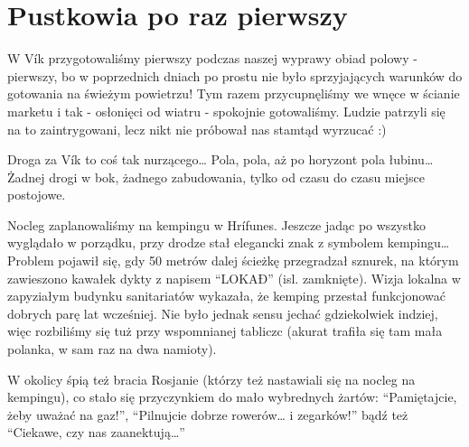 \section*{Pustkowia po raz pierwszy}

W Vík przygotowaliśmy pierwszy podczas naszej wyprawy obiad polowy - pierwszy, bo w poprzednich dniach po prostu nie było sprzyjających warunków do gotowania na świeżym powietrzu! Tym razem przycupnęliśmy we wnęce w ścianie marketu i tak - osłonięci od wiatru - spokojnie gotowaliśmy. Ludzie patrzyli się na to zaintrygowani, lecz nikt nie próbował nas stamtąd wyrzucać :)

Droga za Vík to coś tak nurzącego… Pola, pola, aż po horyzont pola łubinu…Żadnej drogi w bok, żadnego zabudowania, tylko od czasu do czasu miejsce postojowe.


Nocleg zaplanowaliśmy na kempingu w Hrífunes. Jeszcze jadąc po  wszystko wyglądało w porządku, przy drodze stał elegancki znak z symbolem kempingu… Problem pojawił się, gdy 50 metrów dalej ścieżkę przegradzał sznurek, na którym zawieszono kawałek dykty z napisem “LOKAÐ” (isl. zamknięte). Wizja lokalna w zapyziałym budynku sanitariatów wykazała, że kemping przestał funkcjonować dobrych parę lat wcześniej. Nie było jednak sensu jechać gdziekolwiek indziej, więc rozbiliśmy się tuż przy wspomnianej tabliczc (akurat trafiła się tam mała polanka, w sam raz na dwa namioty).

W okolicy śpią też bracia Rosjanie (którzy też nastawiali się na nocleg na kempingu), co stało się przyczynkiem do mało wybrednych żartów: “Pamiętajcie, żeby uważać na gaz!”, “Pilnujcie dobrze rowerów… i zegarków!” bądź też “Ciekawe, czy nas zaanektują…”